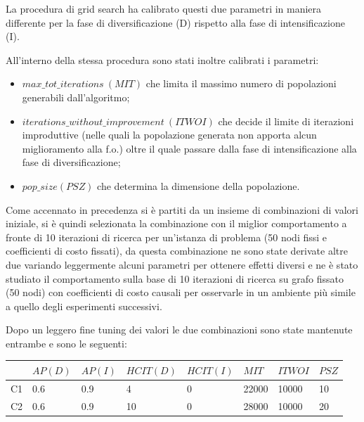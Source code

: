 \documentclass[a4paper]{article}
\begin{document}
            La procedura di grid search ha calibrato questi due parametri in maniera differente per la fase di diversificazione (D) rispetto alla fase di intensificazione (I).

            All'interno della stessa procedura sono stati inoltre calibrati i parametri:
            \begin{itemize}
                \item $max\_tot\_iterations\ (MIT)$ che limita il massimo numero di popolazioni generabili dall'algoritmo;
                \item $iterations\_without\_improvement\ (ITWOI)$ che decide il limite di iterazioni improduttive (nelle quali la popolazione generata non apporta alcun miglioramento alla f.o.)
                    oltre il quale passare dalla fase di intensificazione alla fase di diversificazione;
                \item $pop\_size (PSZ)$ che determina la dimensione della popolazione.
            \end{itemize}

            Come accennato in precedenza si \`e partiti da un insieme di combinazioni di valori iniziale, si \`e quindi selezionata la combinazione con il miglior comportamento a fronte di 10 iterazioni
            di ricerca per un'istanza di problema (50 nodi fissi e coefficienti di costo fissati), da questa combinazione ne sono state derivate altre due variando leggermente alcuni parametri
            per ottenere effetti diversi e ne \`e stato studiato il comportamento sulla base di 10 iterazioni di ricerca su grafo fissato (50 nodi) con coefficienti di costo causali per osservarle
            in un ambiente pi\`u simile a quello degli esperimenti successivi.

            Dopo un leggero fine tuning dei valori le due combinazioni sono state mantenute entrambe e sono le seguenti:

            \begin{center}
                \begin{tabular}{|l|l|l|l|l|l|l|l|}  \hline
                    & $AP (D)$ & $AP (I)$ & $HCIT (D)$ & $HCIT (I)$ & $MIT$ & $ITWOI$ & $PSZ$ \\ \hline

                    C1 & 0.6        & 0.9        & 4       & 0           & 22000           & 10000            & 10    \\ \hline

                    C2 & 0.6        & 0.9        & 10       & 0           & 28000           & 10000            & 20    \\ \hline 
                \end{tabular}
            \end{center}
\end{document}
